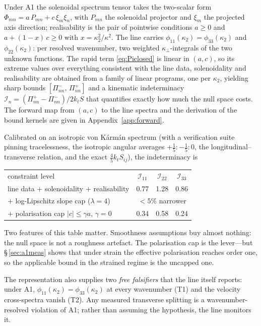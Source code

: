 \documentclass[lineno]{JFM-FLM_Au}
\newcounter{assumption}
\begin{document}
Under A1 the solenoidal spectrum tensor takes the two-scalar form
$\Phi_{mn}=a\,P_{mn}+c\,\xi_m\xi_n$, with $P_{mn}$ the solenoidal projector
and $\xi_m$ the projected axis direction; realisability is the pair of
pointwise conditions $a\ge0$ and $a+(1-x)\,c\ge0$ with
$x=\kappa_2^2/\kappa^2$. The line carries $\phi_{11}(\kappa_2)
=\phi_{33}(\kappa_2)$ and $\phi_{22}(\kappa_2)$: per resolved wavenumber,
two weighted $\kappa_\perp$-integrals of the two unknown functions. The
rapid term \eqref{eq:Piclosed} is linear in $(a,c)$, so its extreme values
over everything consistent with the line data, solenoidality and
realisability are obtained from a family of linear programs, one per
$\kappa_2$, yielding sharp bounds
$[\Pi^{-}_{nn},\,\Pi^{+}_{nn}]$ and a kinematic indeterminacy
$\mathcal I_n=(\Pi^{+}_{nn}-\Pi^{-}_{nn})/2k_tS$ that quantifies exactly
how much the null space costs. The forward map from $(a,c)$ to the line
spectra and the derivation of the bound kernels are given in
Appendix~\ref{app:forward}.

Calibrated on an isotropic von K\'arm\'an spectrum (with a verification
suite pinning tracelessness, the isotropic angular averages
$+\tfrac15:-\tfrac15:0$, the longitudinal--transverse relation, and the
exact $\tfrac45 k_t S_{ij}$), the indeterminacy is
\begin{center}\small
\begin{tabular}{lccc}
constraint level & $\mathcal I_{11}$ & $\mathcal I_{22}$ & $\mathcal I_{33}$\\[1pt]
line data $+$ solenoidality $+$ realisability & 0.77 & 1.28 & 0.86\\
$+$ log-Lipschitz slope cap ($\lambda=4$) & \multicolumn{3}{c}{$<5\%$ narrower}\\
$+$ polarisation cap $|c|\le\gamma a$, $\gamma=0$ & 0.34 & 0.58 & 0.24\\
\end{tabular}
\end{center}
Two features of this table matter. Smoothness assumptions buy almost
nothing: the null space is not a roughness artefact. The polarisation cap
is the lever---but \S\,\ref{sec:a1meas} shows that under strain the
effective polarisation reaches order one, so the applicable bound in the strained regime is the uncapped one.

The representation also supplies two \emph{free falsifiers} that the line
itself reports: under A1, $\phi_{11}(\kappa_2)=\phi_{33}(\kappa_2)$ at
every wavenumber (T1) and the velocity cross-spectra vanish (T2). Any
measured transverse splitting is a wavenumber-resolved violation of A1;
rather than assuming the hypothesis, the line monitors it.
\end{document}
